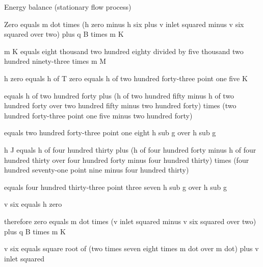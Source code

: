 Energy balance (stationary flow process)

Zero equals m dot times (h zero minus h six plus v inlet squared minus v six squared over two) plus q B times m K

m K equals eight thousand two hundred eighty divided by five thousand two hundred ninety-three times m M

h zero equals h of T zero equals h of two hundred forty-three point one five K

equals h of two hundred forty plus (h of two hundred fifty minus h of two hundred forty over two hundred fifty minus two hundred forty) times (two hundred forty-three point one five minus two hundred forty)

equals two hundred forty-three point one eight h sub g over h sub g

h J equals h of four hundred thirty plus (h of four hundred forty minus h of four hundred thirty over four hundred forty minus four hundred thirty) times (four hundred seventy-one point nine minus four hundred thirty)

equals four hundred thirty-three point three seven h sub g over h sub g

v six equals h zero

therefore zero equals m dot times (v inlet squared minus v six squared over two) plus q B times m K

v six equals square root of (two times seven eight times m dot over m dot) plus v inlet squared